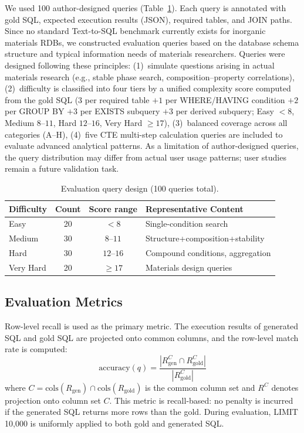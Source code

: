 \documentclass{npj-compt.mater}
\begin{document}
We used 100 author-designed queries (Table~\ref{tab:query_design}).
Each query is annotated with gold SQL, expected execution results
(JSON), required tables, and JOIN paths.
Since no standard Text-to-SQL benchmark currently exists for
inorganic materials RDBs, we constructed evaluation queries based on
the database schema structure and typical information needs of
materials researchers.
Queries were designed following these principles:
(1)~simulate questions arising in actual materials research
(e.g., stable phase search, composition--property correlations),
(2)~difficulty is classified into four tiers by a unified
complexity score computed from the gold SQL
($3$ per required table $+1$ per WHERE/HAVING condition
$+2$ per GROUP BY $+3$ per EXISTS subquery $+3$ per derived
subquery; Easy $<8$, Medium $8$--$11$, Hard $12$--$16$,
Very Hard $\geq 17$),
(3)~balanced coverage across all categories (A--H),
(4)~five CTE multi-step calculation queries are included to
evaluate advanced analytical patterns.
As a limitation of author-designed queries, the query distribution
may differ from actual user usage patterns; user studies remain
a future validation task.

\begin{table}[t]
  \centering
  \caption{Evaluation query design (100 queries total).}
  \label{tab:query_design}
  \small
  \begin{tabular}{@{}lccl@{}}
    \toprule
    Difficulty & Count & Score range & Representative Content \\
    \midrule
    Easy & 20 & $< 8$ & Single-condition search \\
    Medium & 30 & $8$--$11$ & Structure+composition+stability \\
    Hard & 30 & $12$--$16$ & Compound conditions, aggregation \\
    Very Hard & 20 & $\geq 17$ & Materials design queries \\
    \bottomrule
  \end{tabular}
\end{table}

\subsection{Evaluation Metrics}

Row-level recall is used as the primary metric.
The execution results of generated SQL and gold SQL are projected
onto common columns, and the row-level match rate is computed:
\begin{equation}
  \text{accuracy}(q) = \frac{|R_\text{gen}^{C} \cap R_\text{gold}^{C}|}{|R_\text{gold}^{C}|}
  \label{eq:column_aware}
\end{equation}
where $C = \text{cols}(R_\text{gen}) \cap \text{cols}(R_\text{gold})$
is the common column set and $R^C$ denotes projection onto column
set $C$.
This metric is recall-based: no penalty is incurred if the generated
SQL returns more rows than the gold.
During evaluation, LIMIT 10{,}000 is uniformly applied to both
gold and generated SQL.
\end{document}
